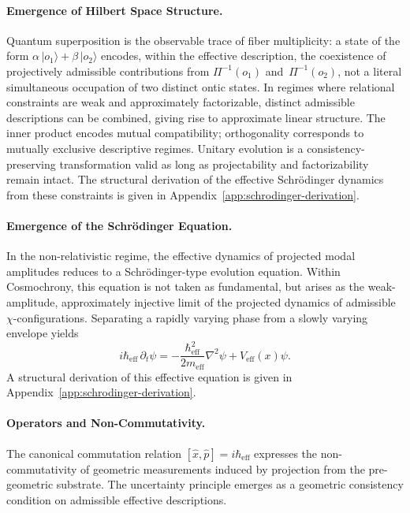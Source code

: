   \paragraph{Emergence of Hilbert Space Structure.}
    \label{subsec:emergence-of-hilbert-space-structure}
    Quantum superposition is the observable trace of fiber multiplicity:
    a state of the form $\alpha\,|{o_1}\rangle + \beta\,|{o_2}\rangle$
    encodes, within the effective description, the coexistence of
    projectively admissible contributions from $\Pi^{-1}(o_1)$
    and~$\Pi^{-1}(o_2)$, not a literal simultaneous occupation of two
    distinct ontic states.
    In regimes where relational constraints are weak and approximately
    factorizable, distinct admissible descriptions can be combined, giving
    rise to approximate linear structure.
    The inner product encodes mutual compatibility; orthogonality corresponds
    to mutually exclusive descriptive regimes.
    Unitary evolution is a consistency-preserving transformation valid as long
    as projectability and factorizability remain intact.
    The structural derivation of the effective Schr\"odinger dynamics from
    these constraints is given in Appendix~\ref{app:schrodinger-derivation}.

  \paragraph{Emergence of the Schr\"odinger Equation.}
    \label{subsec:schrodinger-emergence}

    In the non-relativistic regime, the effective dynamics of projected modal amplitudes
    reduces to a Schr\"odinger-type evolution equation.
    Within Cosmochrony, this equation is not taken as fundamental, but arises as the
    weak-amplitude, approximately injective limit of the projected dynamics of admissible
    $\chi$-configurations.
    Separating a rapidly varying phase from a slowly varying envelope yields
    \begin{equation}
      i\hbar_{\mathrm{eff}}\,\partial_t \psi
      = -\frac{\hbar_{\mathrm{eff}}^2}{2m_{\mathrm{eff}}}\nabla^2 \psi
      + V_{\mathrm{eff}}(x)\psi.
      \label{eq:schrodinger-effective}
    \end{equation}
    A structural derivation of this effective equation is given in
    Appendix~\ref{app:schrodinger-derivation}.

  \paragraph{Operators and Non-Commutativity.}
    \label{subsec:operators-from-chi}
    The canonical commutation relation $[\hat{x}, \hat{p}] = i \hbar_{\mathrm{eff}}$
    expresses the non-commutativity of geometric measurements induced by projection from the pre-geometric substrate.
    The uncertainty principle emerges as a geometric consistency condition on admissible effective descriptions.

